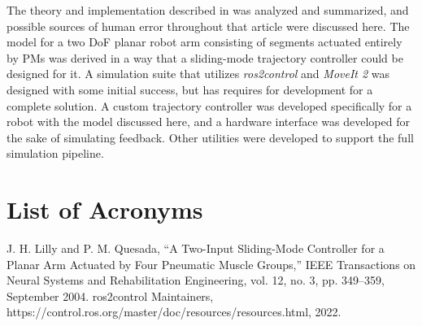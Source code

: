 \documentclass[conference]{IEEEtran}
\begin{document}
	The theory and implementation described in \cite{main-article} was analyzed and summarized, and possible sources of human error throughout that article were discussed here. The model for a two \ac{DoF} planar robot arm consisting of segments actuated entirely by \acp{PM} was derived in a way that a sliding-mode trajectory controller could be designed for it. A simulation suite that utilizes \textit{ros2\textunderscore control} and \textit{MoveIt 2} was designed with some initial success, but has requires for development for a complete solution. A custom trajectory controller was developed specifically for a robot with the model discussed here, and a hardware interface was developed for the sake of simulating feedback. Other utilities were developed to support the full simulation pipeline.

	\section{List of Acronyms}

	\begin{acronym}
	\end{acronym}
	
	\begin{thebibliography}{00}
		 J. H. Lilly and P. M. Quesada, ``A Two-Input Sliding-Mode Controller for a Planar Arm Actuated by Four Pneumatic Muscle Groups,'' IEEE Transactions on Neural Systems and Rehabilitation Engineering, vol. 12, no. 3, pp. 349--359, September 2004.
		 ros2\textunderscore control Maintainers,\\
		https://control.ros.org/master/doc/resources/resources.html, 2022.
	\end{thebibliography}
	
\end{document}
